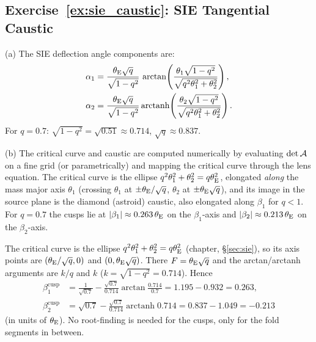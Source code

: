 \subsection*{Exercise~\ref{ex:sie_caustic}: SIE Tangential Caustic}

(a) The SIE deflection angle components are:
\begin{align*}
    \alpha_1 &= \frac{\theta_{\mathrm{E}}\sqrt{q}}{\sqrt{1-q^2}}\,
    \arctan\!\left(\frac{\theta_1\sqrt{1-q^2}}
    {\sqrt{q^2\theta_1^2 + \theta_2^2}}\right) , \\
    \alpha_2 &= \frac{\theta_{\mathrm{E}}\sqrt{q}}{\sqrt{1-q^2}}\,
    \mathrm{arctanh}\!\left(\frac{\theta_2\sqrt{1-q^2}}
    {\sqrt{q^2\theta_1^2 + \theta_2^2}}\right) .
\end{align*}
For $q = 0.7$: $\sqrt{1-q^2} = \sqrt{0.51} \approx 0.714$,
$\sqrt{q} \approx 0.837$.

(b) The critical curve and caustic are computed numerically
by evaluating $\det\mathcal{A}$ on a fine grid (or parametrically) and
mapping the critical curve through the lens equation.  The critical
curve is the ellipse $q^2\theta_1^2 + \theta_2^2 = q\theta_{\mathrm{E}}^2$, elongated \emph{along} the mass major axis $\theta_1$
(crossing $\theta_1$ at $\pm\theta_{\mathrm{E}}/\sqrt{q}$, $\theta_2$ at
$\pm\theta_{\mathrm{E}}\sqrt{q}$), and its image in the source plane is the
diamond (astroid) caustic, also elongated along $\beta_1$ for $q < 1$.
For $q = 0.7$ the cusps lie at
$|\beta_1| \approx 0.263\,\theta_{\mathrm{E}}$ on the $\beta_1$-axis and
$|\beta_2| \approx 0.213\,\theta_{\mathrm{E}}$ on the $\beta_2$-axis.

\begin{derivation}
The critical curve is the ellipse $q^2\theta_1^2 + \theta_2^2 = q\theta_{\mathrm{E}}^2$
(chapter, \S\ref{sec:sie}), so its axis points are
$(\theta_{\mathrm{E}}/\sqrt{q}, 0)$ and $(0, \theta_{\mathrm{E}}\sqrt{q})$.  There $F = \theta_{\mathrm{E}}\sqrt{q}$
and the arctan/arctanh arguments are $k/q$ and $k$ ($k = \sqrt{1-q^2} = 0.714$).
Hence
\begin{align*}
  \beta_1^{\mathrm{cusp}} &= \tfrac{1}{\sqrt{0.7}} - \tfrac{\sqrt{0.7}}{0.714}\arctan\tfrac{0.714}{0.7}
  = 1.195 - 0.932 = 0.263,\\
  \beta_2^{\mathrm{cusp}} &= \sqrt{0.7} - \tfrac{\sqrt{0.7}}{0.714}\operatorname{arctanh}0.714
  = 0.837 - 1.049 = -0.213
\end{align*}
(in units of $\theta_{\mathrm{E}}$).  No root-finding is needed for the cusps, only for
the fold segments in between.
\end{derivation}


